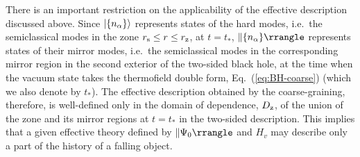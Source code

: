 \documentclass[12pt]{article}
\begin{document}
There is an important restriction on the applicability of the 
effective description discussed above.  Since $| \{ n_\alpha \} \rangle$ 
represents states of the hard modes, i.e.\ the semiclassical 
modes in the zone $r_{\rm s} \leq r \leq r_{\rm z}$, at $t = t_*$, 
$\ketc{\{ n_\alpha \}}$ represents states of their mirror modes, 
i.e.\ the semiclassical modes in the corresponding mirror region 
in the second exterior of the two-sided black hole, at the 
time when the vacuum state takes the thermofield double form, 
Eq.~(\ref{eq:BH-coarse}) (which we also denote by $t_*$).  The 
effective description obtained by the coarse-graining, therefore, 
is well-defined only in the domain of dependence, $D_{\rm z}$, of 
the union of the zone and its mirror regions at $t = t_*$ in the 
two-sided description.  This implies that a given effective theory 
defined by $\ketc{\Psi_0}$ and $H_v$ may describe only a part of 
the history of a falling object.
\end{document}
